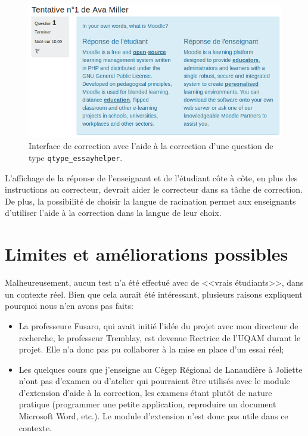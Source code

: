 \begin{figure}[htbp]
  \includegraphics[scale=0.85]{images/questionform_correction.png}
  \caption{Interface de correction avec l'aide \`a la correction d'une question de type \texttt{qtype\_essayhelper}.}
  \label{questionform_correction}
\end{figure}

L'affichage de la r\'eponse de l'enseignant et de l'\'etudiant c\^ote \`a c\^ote, en plus des instructions au correcteur, devrait aider le correcteur dans sa t\^ache de correction.
De plus, la possibilit\'e de choisir la langue de racination permet aux enseignants d'utiliser l'aide \`a la correction dans la langue de leur choix.

\section{Limites et am\'eliorations possibles}
Malheureusement, aucun test n'a \'et\'e effectu\'e avec de <<vrais
\'etudiants>>, dans un contexte r\'eel.  Bien que cela aurait \'et\'e
int\'eressant, plusieurs raisons expliquent pourquoi nous n'en avons
pas faits:
\begin{itemize}
  \item La professeure Fusaro, qui avait initi\'e l'id\'ee du projet avec mon directeur de recherche, le professeur Tremblay, est devenue Rectrice de l'UQAM durant le projet. Elle n'a donc pas pu collaborer \`a la mise en place d'un essai r\'eel;
  \item Les quelques cours que j'enseigne au C\'egep R\'egional de Lanaudi\`ere \`a Joliette n'ont pas d'examen ou d'atelier qui pourraient \^etre utilis\'es avec le module d'extension d'aide \`a la correction,
    les examens \'etant plut\^ot de nature pratique (programmer une petite application, reproduire un document Microsoft Word, etc.). Le module d'extension n'est donc pas utile dans ce contexte.
\end{itemize}

